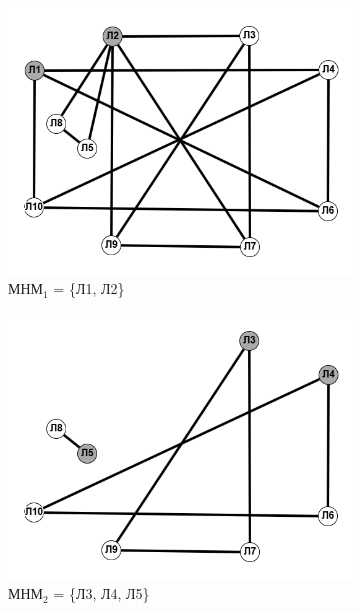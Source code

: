 \documentclass{article}
\begin{document}
\begin{enumerate}
\begin{figure}[ht]
\begin{subfigure}[b]{0.3\textwidth}
         \includegraphics[width=\textwidth]{attachments/15/15_1.png}
         \caption*{\footnotesize{$\text{МНМ}_1$ = \{Л1,  Л2\}}}
         \label{fig:15_1}
     \end{subfigure}
     \hfill
     \begin{subfigure}[b]{0.3\textwidth}
         \centering
         \includegraphics[width=\textwidth]{attachments/15/15_2.png}
         \caption*{\footnotesize{$\text{МНМ}_2$ = \{Л3, Л4, Л5\}}}
         \label{fig:15_2}
        \end{subfigure}
    \hfill
     \begin{subfigure}[b]{0.3\textwidth}
         \centering

\end{subfigure}
\end{figure}
\end{enumerate}
\end{document}
